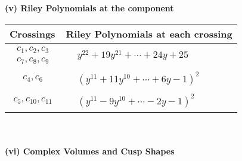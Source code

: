 \documentclass[1p]{elsarticle_modified}
\theoremstyle{definition}
\begin{document}
\newpage\renewcommand{\arraystretch}{1}
\flushleft \textbf{(v) Riley Polynomials at the component}\newline \\
\begin{tabular}{m{50pt}|m{274pt}}
Crossings & \hspace{64pt}Riley Polynomials at each crossing \\
\hline $$\begin{aligned}c_{1},c_{2},c_{3}\\c_{7},c_{8},c_{9}\end{aligned}$$&$\begin{aligned}
&y^{22}+19 y^{21}+\cdots+24 y+25
\end{aligned}$\\
\hline $$\begin{aligned}c_{4},c_{6}\end{aligned}$$&$\begin{aligned}
&(y^{11}+11 y^{10}+\cdots+6 y-1)^{2}
\end{aligned}$\\
\hline $$\begin{aligned}c_{5},c_{10},c_{11}\end{aligned}$$&$\begin{aligned}
&(y^{11}-9 y^{10}+\cdots-2 y-1)^{2}
\end{aligned}$\\
\hline
\end{tabular}\\~\\
\newpage\flushleft \textbf{(vi) Complex Volumes and Cusp Shapes}
\end{document}
